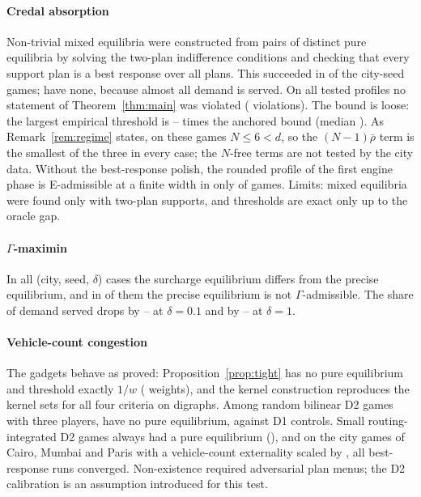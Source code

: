 \documentclass[preprint,11pt]{elsarticle}
\theoremstyle{definition}
\theoremstyle{remark}
\begin{document}
\paragraph{Credal absorption} Non-trivial mixed equilibria were constructed from pairs of distinct pure equilibria by solving the two-plan indifference conditions and checking that every support plan is a best response over all plans. This succeeded in \ThGamesMixed{} of the \ThGamesTotal{} city-seed games; \ThNoMixedCities{} have none, because almost all demand is served. On all \ThProfiles{} tested profiles no statement of Theorem~\ref{thm:main} was violated (\ThViol{} violations). The bound is loose: the largest empirical threshold is \ThRatioMin--\ThRatioMax{} times the anchored bound (median \ThRatioMed). As Remark~\ref{rem:regime} states, on these games $N\le6<d$, so the $(N-1)\bar\rho$ term is the smallest of the three in every case; the $N$-free terms are not tested by the city data. Without the best-response polish, the rounded profile of the first engine phase is E-admissible at a finite width in only \ThZmcFinite{} of \ThZmcN{} games. Limits: mixed equilibria were found only with two-plan supports, and thresholds are exact only up to the oracle gap.

\paragraph{$\Gamma$-maximin} In all \ThGamCases{} (city, seed, $\delta$) cases the surcharge equilibrium differs from the precise equilibrium, and in \ThGamNotAdm{} of them the precise equilibrium is not $\Gamma$-admissible. The share of demand served drops by \ThGamDropLoMin--\ThGamDropLoMax{} at $\delta=0.1$ and by \ThGamDropHiMin--\ThGamDropHiMax{} at $\delta=1$.

\paragraph{Vehicle-count congestion} The gadgets behave as proved: Proposition~\ref{prop:tight} has no pure equilibrium and threshold exactly $1/w$ (\ThPropOK{} weights), and the kernel construction reproduces the kernel sets for all four criteria on \ThKernOK{} digraphs. Among random bilinear D2 games with three players, \ThRandDtwo{} have no pure equilibrium, against \ThRandDone{} D1 controls. Small routing-integrated D2 games always had a pure equilibrium (\ThTiny{}), and on the city games of Cairo, Mumbai and Paris with a vehicle-count externality scaled by \ThCityScales{}, all \ThCityRuns{} best-response runs converged. Non-existence required adversarial plan menus; the D2 calibration is an assumption introduced for this test.
\end{document}
